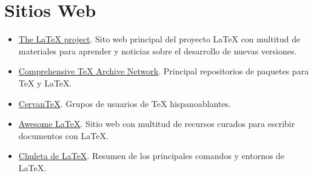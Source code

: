 \documentclass[
  spanish,
  a4paper,
]{scrreport}
\providecommand{\tightlist}{%
  \setlength{\itemsep}{0pt}\setlength{\parskip}{0pt}}
\theoremstyle{definition}
\theoremstyle{remark}
\begin{document}
\section*{Sitios Web}\label{sitios-web}


\begin{itemize}
\tightlist
\item
  \href{https://www.latex-project.org/}{The LaTeX project}. Sito web
  principal del proyecto LaTeX con multitud de materiales para aprender
  y noticias sobre el desarrollo de nuevas versiones.
\item
  \href{https://ctan.org/}{Comprehensive TeX Archive Network}. Principal
  repositorios de paquetes para TeX y LaTeX.
\item
  \href{www.cervantex.es/}{CervanTeX}. Grupos de usuarios de TeX
  hispanoablantes.
\item
  \href{https://project-awesome.org/egeerardyn/awesome-LaTeX}{Awesome
  LaTeX}. Sitio web con multitud de recursos curados para escribir
  documentos con LaTeX.
\item
  \href{chulatex.pdf}{Chuleta de LaTeX}. Resumen de los principales
  comandos y entornos de LaTeX.
\end{itemize}
\end{document}
